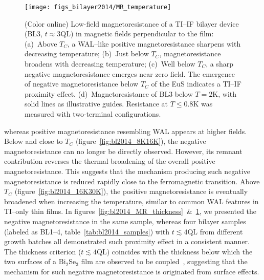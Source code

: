 \begin{figure}[ht]%
\centering%
\subfloat{\label{fig:bl2014_16K30K}}%
\subfloat{\label{fig:bl2014_8K16K}}%
\subfloat{\label{fig:bl2014_2K8K}}%
\subfloat{\label{fig:bl2014_He3}}%
\texttt{[image: figs\_bilayer2014/MR\_temperature]}%
\caption[Temperature dependence of the magnetoresistance of a Bi$_2$Se$_3$--EuS bilayer]{\label{fig:bl2014_MR_temperature}(Color online) Low-field magnetoresistance of a TI--IF bilayer device (BL3, $t\approx3\mathrm{QL}$) in magnetic fields perpendicular to the film: (a)~Above $T_C$, a WAL--like positive magnetoresistance sharpens with decreasing temperature; (b)~Just below $T_C$, magnetoresistance broadens with decreasing temperature; (c)~Well below $T_C$, a sharp negative magnetoresistance emerges near zero field. The emergence of negative magnetoresistance below $T_C$ of the EuS indicates a TI--IF proximity effect. (d)~Magnetoresistance of BL3 below $T=2$K, with solid lines as illustrative guides. Resistance at $T\leq0.8\mathrm{K}$ was measured with two-terminal configurations.}
\end{figure}%
%
whereas positive magnetoresistance resembling WAL appears at higher fields. Below and close to $T_C$ (figure~\ref{fig:bl2014_8K16K}), the negative magnetoresistance can no longer be directly observed. However, its remnant contribution reverses the thermal broadening of the overall positive magnetoresistance. This suggests that the mechanism producing such negative magnetoresistance is reduced rapidly close to the ferromagnetic transition. Above $T_C$ (figure~\ref{fig:bl2014_16K30K}), the positive magnetoresistance is eventually broadened when increasing the temperature, similar to common WAL features in TI--only thin films. In figures~\ref{fig:bl2014_MR_thickness}~\&~\ref{fig:bl2014_MR_temperature}, we presented the negative magnetoresistance in the same sample, whereas four bilayer samples (labeled as BL1--4, table~\ref{tab:bl2014_samples}) with $t\lesssim4\mathrm{QL}$ from different growth batches all demonstrated such proximity effect in a consistent manner. The thickness criterion ($t\lesssim4\mathrm{QL}$) coincides with the thickness below which the two surfaces of a Bi$_2$Se$_3$ film are observed to be coupled~\cite{ARPES_thickness}, suggesting that the mechanism for such negative magnetoresistance is originated from surface effects.

